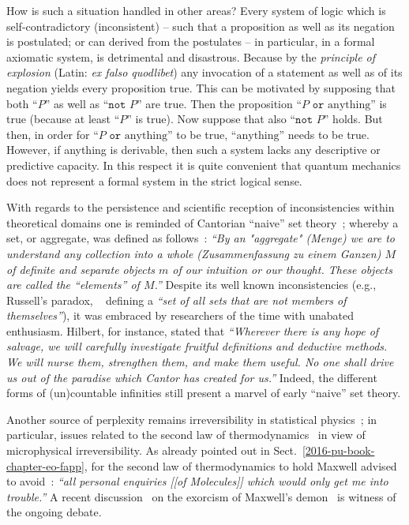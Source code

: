 How is such a situation handled in other areas?
Every system of logic which is self-contradictory (inconsistent) -- such that a proposition as well as its negation is postulated;
or can derived from the postulates
-- in particular,
in a formal axiomatic system, is  detrimental and disastrous.
Because by the {\em principle of explosion} (Latin: {\it ex falso quodlibet})
any invocation of a statement as well as of its negation yields every proposition true.
This can be motivated by supposing that both  ``$P$'' as well as ``$\texttt{not }P$'' are true.
Then the proposition ``$P \texttt{ or }\textrm{anything}$'' is true (because at least  ``$P$'' is true).
Now suppose that also  ``$\texttt{not }P$'' holds. But then, in order for ``$P \texttt{ or }\textrm{anything}$''
to be true, ``$\textrm{anything}$'' needs to be true.
However, if anything is derivable, then such a system lacks any descriptive or predictive capacity.
In this respect it is quite convenient that quantum mechanics does not represent a formal system in the strict logical sense.

With regards to the persistence and scientific reception of inconsistencies within theoretical domains
one is reminded of Cantorian ``naive'' set theory~\cite{cantor-set,cantor-set2};
whereby a set, or aggregate, was defined as follows~\cite[p.~85]{cantor-set-engl}:
{\em ``By an "aggregate" {\em (Menge)} we are to understand
any collection into a whole {\em (Zusammenfassung  zu
einem Ganzen)} $M$ of definite and separate objects $m$
of our intuition or our thought. These objects are
called the ``elements'' of $M$.''}
Despite its well known inconsistencies (e.g.,
{Russell's paradox},
~\cite{sep-russell-paradox}
defining a
{\em ``set of all sets that are not members of themselves''}), it
was embraced by researchers of the time with unabated enthusiasm. Hilbert, for instance, stated that
{\em ``Wherever there is any hope of salvage, we will carefully investigate
fruitful definitions and deductive methods. We will nurse them,
strengthen them, and make them useful. No one shall drive us out
of the paradise which Cantor has created for us.''}
Indeed, the different forms of (un)countable infinities  still present a marvel of early ``naive'' set theory.

Another source of perplexity remains irreversibility in statistical physics~\cite{Norton201643}; in particular,
issues related to the second law of thermodynamics~\cite{Myrvold2011237}
in view of microphysical irreversibility.
As already pointed out in Sect.~\ref{2016-pu-book-chapter-eo-fapp}, for the second law of thermodynamics to hold Maxwell advised to avoid~\cite[p.~422]{garber}:
{\em ``all personal enquiries [[of Molecules]] which would only get me into trouble.''}
A recent discussion~\cite{Bub2001569,DAbramo-2012,Norton-Demon-13,Rex-2017} on the exorcism of Maxwell's demon~\cite{Earman1998435,Earman19991,maxwell-demon2}
is witness of the ongoing debate.

